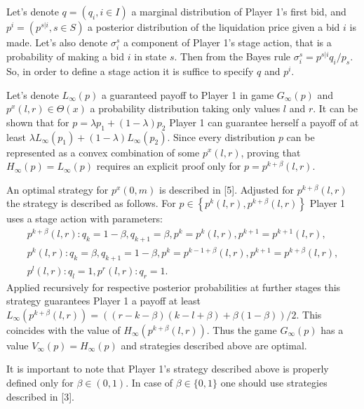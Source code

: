 Let's denote $q = (q_i, i \in I)$ a marginal distribution of Player 1's first
bid, and $p^i = (p^{s|i}, s \in S)$ a posterior distribution of the liquidation
price given a bid $i$ is made. Let's also denote $\sigma^s_i$ a component of
Player 1's stage action, that is a probability of making a bid $i$ in state $s$.
Then from the Bayes rule $\sigma^s_i = p^{s|i} q_i / p_s$. So, in order to
define a stage action it is suffice to specify $q$ and $p^i$.

Let's denote $L_\infty(p)$ a guaranteed payoff to Player 1 in game $G_\infty(p)$
and $p^x(l, r) \in \Theta(x)$ a probability distribution taking only values $l$
and $r$. It can be shown that for $p = \lambda p_1 + (1-\lambda) p_2$ Player 1
can guarantee herself a payoff of at least $\lambda L_\infty(p_1) + (1-\lambda)
L_\infty(p_2)$. Since every distribution $p$ can be represented as a convex
combination of some $p^x(l,r)$, proving that $H_\infty(p) = L_\infty(p)$
requires an explicit proof only for $p = p^{k+\beta}(l, r)$.

An optimal strategy for $p^x(0, m)$ is described in [5]. Adjusted for
$p^{k+\beta}(l, r)$ the strategy is described as follows. For $p \in \left\{
  p^k(l, r), p^{k+\beta}(l, r) \right\}$ Player 1 uses a stage action with
parameters:
\begin{gather*}
  p^{k+\beta}(l, r):
  q_k = 1-\beta, q_{k+1} = \beta, p^k = p^k(l,r), p^{k+1} = p^{k+1}(l,r),\\
  p^k(l,r):
  q_k = \beta, q_{k+1} = 1-\beta, p^k = p^{k-1+\beta}(l,r), p^{k+1} = p^{k+\beta}(l,r),\\
  p^l(l,r): q_l = 1, p^r(l,r): q_r = 1.
\end{gather*}
Applied recursively for respective posterior probabilities at further stages
this strategy guarantees Player 1 a payoff at least $L_\infty(p^{k+\beta}(l, r))
= ((r - k - \beta)(k - l + \beta) + \beta(1-\beta))/2$. This coincides with the
value of $H_\infty(p^{k+\beta}(l, r))$. Thus the game $G_\infty(p)$ has a value
$V_\infty(p) = H_\infty(p)$ and strategies described above are optimal.

It is important to note that Player 1's strategy described above is properly
defined only for $\beta \in (0, 1)$. In case of $\beta \in \{0, 1\}$ one should
use strategies described in [3].

